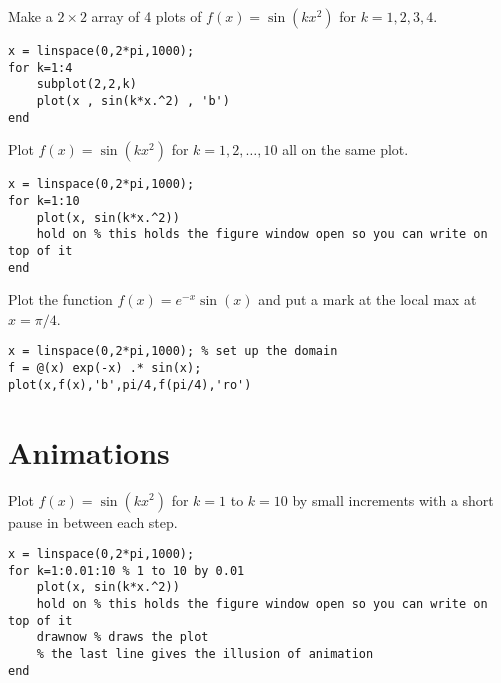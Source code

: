\begin{example}
    Make a $2\times 2$ array of 4 plots of $f(x) = \sin(k x^2)$ for $k=1, 2, 3, 4$.
\begin{lstlisting}
x = linspace(0,2*pi,1000);
for k=1:4
    subplot(2,2,k)
    plot(x , sin(k*x.^2) , 'b')
end
\end{lstlisting}
\end{example}


\begin{example}
    Plot $f(x) = \sin(kx^2)$ for $k=1, 2, \ldots, 10$ all on the same plot.
\begin{lstlisting}
x = linspace(0,2*pi,1000);
for k=1:10
    plot(x, sin(k*x.^2))
    hold on % this holds the figure window open so you can write on top of it
end
\end{lstlisting}
\end{example}


\begin{example}
    Plot the function $f(x) = e^{-x} \sin(x)$ and put a mark at the local max at $x =
    \pi/4$.
\begin{lstlisting}
x = linspace(0,2*pi,1000); % set up the domain
f = @(x) exp(-x) .* sin(x);
plot(x,f(x),'b',pi/4,f(pi/4),'ro')
\end{lstlisting}
\end{example}

\section{Animations}

\begin{example}
    Plot $f(x) = \sin(kx^2)$ for $k=1$ to $k= 10$ by small increments with a short pause
    in between each step. 
\begin{lstlisting}
x = linspace(0,2*pi,1000);
for k=1:0.01:10 % 1 to 10 by 0.01
    plot(x, sin(k*x.^2))
    hold on % this holds the figure window open so you can write on top of it
    drawnow % draws the plot
    % the last line gives the illusion of animation
end
\end{lstlisting}
\end{example}




